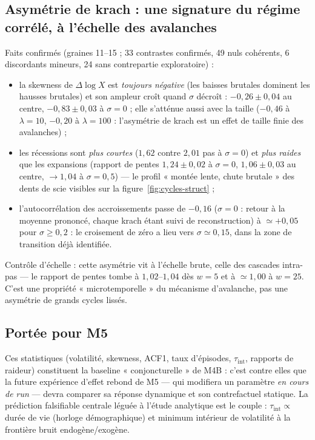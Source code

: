 \documentclass[11pt,a4paper]{article}
\begin{document}
\subsection{Asymétrie de krach : une signature du régime corrélé, à
l'échelle des avalanches}

Faits confirmés (graines 11--15 ; 33 contrastes confirmés, 49 nuls
cohérents, 6 discordants mineurs, 24 sans contrepartie exploratoire) :

\begin{itemize}
\item la skewness de $\Delta\log X$ est \emph{toujours négative} (les
  baisses brutales dominent les hausses brutales) et son ampleur croît
  quand $\sigma$ décroît : $-0{,}26\pm0{,}04$ au centre,
  $-0{,}83\pm0{,}03$ à $\sigma=0$ ; elle s'atténue aussi avec la taille
  ($-0{,}46$ à $\lambda=10$, $-0{,}20$ à $\lambda=100$ : l'asymétrie de
  krach est un effet de taille finie des avalanches) ;
\item les récessions sont \emph{plus courtes} ($1{,}62$ contre
  $2{,}01$ pas à $\sigma=0$) et \emph{plus raides} que les expansions
  (rapport de pentes $1{,}24\pm0{,}02$ à $\sigma=0$, $1{,}06\pm0{,}03$
  au centre, $\to1{,}04$ à $\sigma=0{,}5$) — le profil « montée lente,
  chute brutale » des dents de scie visibles sur la
  figure~\ref{fig:cycles-struct} ;
\item l'autocorrélation des accroissements passe de $-0{,}16$
  ($\sigma=0$ : retour à la moyenne prononcé, chaque krach étant suivi
  de reconstruction) à $\simeq+0{,}05$ pour $\sigma\ge0{,}2$ : le
  croisement de zéro a lieu vers $\sigma\simeq0{,}15$, dans la zone de
  transition déjà identifiée.
\end{itemize}

Contrôle d'échelle : cette asymétrie vit à l'échelle brute, celle des
cascades intra-pas — le rapport de pentes tombe à $1{,}02$--$1{,}04$
dès $w=5$ et à $\simeq1{,}00$ à $w=25$. C'est une propriété
« microtemporelle » du mécanisme d'avalanche, pas une asymétrie de
grands cycles lissés.

\subsection{Portée pour M5}

Ces statistiques (volatilité, skewness, ACF1, taux d'épisodes,
$\tau_{\mathrm{int}}$, rapports de raideur) constituent la baseline
« conjoncturelle » de M4B : c'est contre elles que la future expérience
d'effet rebond de M5 — qui modifiera un paramètre \emph{en cours de
run} — devra comparer sa réponse dynamique et son contrefactuel
statique. La prédiction falsifiable centrale léguée à l'étude
analytique est le couple : $\tau_{\mathrm{int}}\propto$ durée de vie
(horloge démographique) et minimum intérieur de volatilité à la
frontière bruit endogène/exogène.
\end{document}
